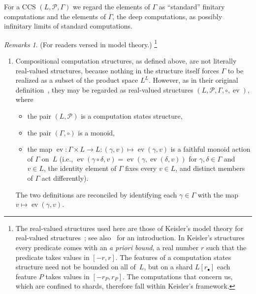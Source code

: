 \documentclass[psamsfonts]{amsart}
\theoremstyle{definition}
\theoremstyle{remark}
\newtheorem{rems}[thm]{Remarks}
\numberwithin{equation}{section}
\begin{document}
For a CCS $(L,\mathcal{P},\Gamma)$ we regard the elements of $\Gamma$ as “standard” finitary computations and the elements of $\overline{\Gamma}$, the deep computations, as possibly infinitary limits of standard computations.

\begin{rems}(For readers versed in model theory.)%
  \footnote{The real-valued structures used here are those of Keisler’s model theory for real-valued structures~\cite{Keisler:2023}; see also~\cite[Section~6]{Duenez-Iovino:2017} for an introduction.
    In Keisler's structures every predicate comes with an \emph{a priori bound}, a real number $r$ such that the predicate takes values in $[-r,r]$.
    The features of a computation states structure need not be bounded on all of~$L$, but on a shard $L[r_\bullet]$ each feature $P$ takes values in $[-r_P,r_P]$.
    The computations that concern us, which are confined to shards, therefore fall within Keisler's framework.}
  \begin{enumerate}
  \item
    Compositional computation structures, as defined above, are not literally real-valued structures, because nothing in the structure itself forces $\Gamma$ to be realized as a subset of the product space $L^L$.
    However, as in their original definition~\cite{alva2024approximability}, they may be regarded as real-valued structures $(L,\mathcal{P},\Gamma,\circ,\operatorname{ev})$, where
    \begin{itemize}
    \item
      the pair $(L,\mathcal{P})$ is a computation states structure,
    \item
      the pair $(\Gamma,\circ)$ is a monoid,
    \item
      the map $\operatorname{ev}: \Gamma\times L\to L: (\gamma,v)\mapsto \operatorname{ev}(\gamma,v)$ is a faithful monoid action of $\Gamma$ on~$L$
      (i.e., $\operatorname{ev}(\gamma\circ\delta,v) = \operatorname{ev}(\gamma,\operatorname{ev}(\delta,v))$ for $\gamma,\delta\in\Gamma$ and $v\in L$, the identity element of $\Gamma$ fixes every $v\in L$, and distinct members of $\Gamma$ act differently).
    \end{itemize}
    The two definitions are reconciled by identifying each $\gamma\in \Gamma$ with the map $v\mapsto \operatorname{ev}(\gamma,v)$.


\end{enumerate}
\end{rems}
\end{document}
